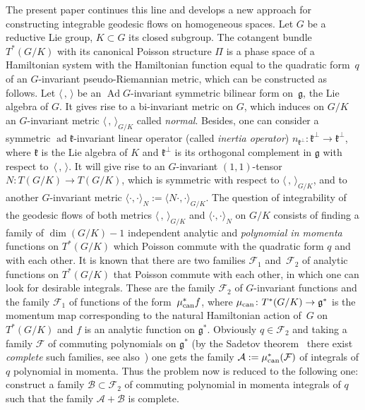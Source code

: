 \documentclass[10pt,a4paper]{amsart}
\numberwithin{equation}{section}
\begin{document}
The present paper continues this line and develops a new approach for constructing integrable geodesic flows on homogeneous spaces. Let $G$ be a reductive Lie group, $K \subset G$ its closed subgroup. The cotangent bundle $T^*(G/K)$ with its canonical Poisson structure $\Pi$ is a phase space of a Hamiltonian system with the Hamiltonian function equal to the quadratic form~$q$ of an $G$-invariant pseudo-Riemannian metric, which can be constructed as follows. Let $\langle\,,\,\rangle$ be an $\operatorname{Ad} G$-invariant symmetric bilinear form on~$\mathfrak{g}$, the Lie algebra of $G$. It gives rise to a bi-invariant metric on $G$, which induces on $G/K$ an $G$-invariant metric $\langle\,,\,\rangle_{G/K}$ called \emph{normal}. Besides, one can consider a symmetric $\operatorname{ad} \mathfrak{k}$-invariant linear operator (called \emph{inertia operator}) $n_{\mathfrak{k}^\perp}\colon \mathfrak{k}^\perp\to\mathfrak{k}^\perp$, where $\mathfrak{k}$ is the Lie algebra of $K$ and $\mathfrak{k}^\perp$ is its orthogonal complement in $\mathfrak{g}$ with respect to~$\langle\,,\,\rangle$. It will give rise to an $G$-invariant $(1,1)$-tensor $N\colon T(G/K)\to T(G/K)$, which is symmetric with respect to $\langle\,,\,\rangle_{G/K}$, and to another $G$-invariant metric $\langle\cdot,\cdot\rangle_N:=\langle N\cdot,\cdot\rangle_{G/K}$. The question of integrability of the geodesic flows of both metrics $\langle\,,\,\rangle_{G/K}$ and $\langle\cdot,\cdot\rangle_N$ on $G/K$ consists of finding a family of $\dim(G/K)-1$ independent analytic and \emph{polynomial in momenta} functions on $T^*(G/K)$ which Poisson commute with the quadratic form $q$ and with each other. It is known \cite[Section~5]{bjObzor} that there are two families $\mathcal{F}_1$ and~$\mathcal{F}_2$ of analytic functions on $T^*(G/K)$ that Poisson commute with each other, in which one can look for desirable integrals. These are the family $\mathcal{F}_2$ of $G$-invariant functions and the family $\mathcal{F}_1$ of functions of the form~$\mu_{\rm can}^*f$, where $\mu_{\rm can}\colon T^*(G/K)\to\mathfrak{g}^*$ is the momentum map corresponding to the natural Hamiltonian action of~$G$ on $T^*(G/K)$ and $f$ is an analytic function on $\mathfrak{g}^*$. Obviously $q\in\mathcal{F}_2$ and taking a family $\mathcal{F}$ of commuting polynomials on $\mathfrak{g}^*$ (by the Sadetov theorem~\cite{sadetov} there exist \emph{complete} such families, see also~\cite{bolsinov16}) one gets the family $\mathcal{A}:=\mu_{\rm can}^*(\mathcal{F})$ of integrals of $q$ polynomial in momenta. Thus the problem now is reduced to the following one: construct a family $\mathcal {B}\subset\mathcal{F}_2$ of commuting polynomial in momenta integrals of $q$ such that the family $\mathcal{A}+\mathcal {B}$ is complete.
\end{document}
